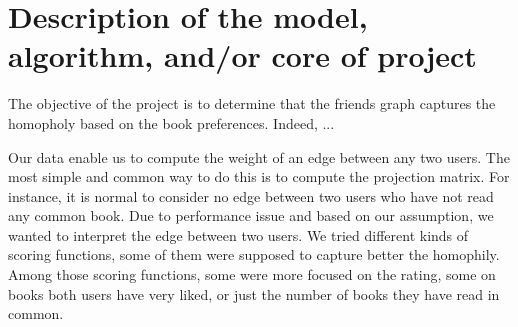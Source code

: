 \documentclass[11pt]{article}
\begin{document}












\section{Description of the model, algorithm, and/or core of project}

The objective of the project is to determine that the friends graph captures the homopholy based on the book preferences.
Indeed, ...

Our data enable us to compute the weight of an edge between any two users. The most simple and common way to do this is to compute the projection matrix. For instance, it is normal to consider no edge between two users who have not read any common book. Due to performance issue and based on our assumption, we wanted to interpret the edge between two users. We tried different kinds of scoring functions, some of them were supposed to capture better the homophily.
Among those scoring functions, some were more focused on the rating, some on books both users have very liked, or just the number of books they have read in common.

\end{document}
